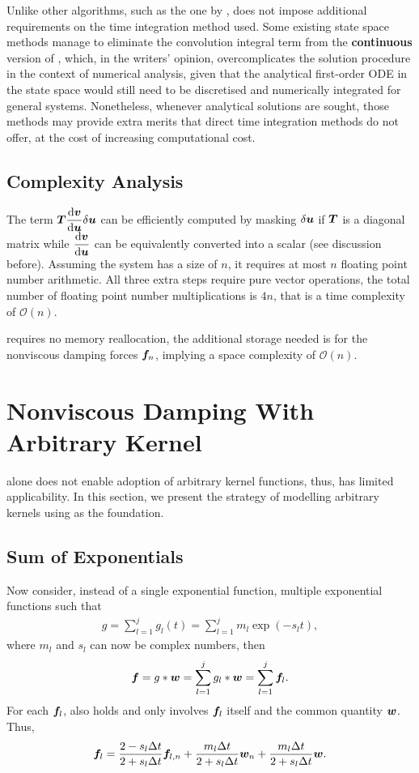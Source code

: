 Unlike other algorithms, such as the one by \citet{Cortes2009},  does not impose additional requirements on the time integration method used. Some existing state space methods manage to eliminate the convolution integral term from the \textbf{continuous} version of  \citep[see][]{Wagner2003,Wu2019}, which, in the writers' opinion, overcomplicates the solution procedure in the context of numerical analysis, given that the analytical first-order ODE in the state space would still need to be discretised \citep{Adhikari2004} and numerically integrated for general systems. Nonetheless, whenever analytical solutions are sought, those methods may provide extra merits that direct time integration methods do not offer, at the cost of increasing computational cost.
\subsection{Complexity Analysis}
The term $\bm{T}\dfrac{\mathrm{d}\bm{v}}{\mathrm{d}\bm{u}}\delta\bm{u}$ can be efficiently computed by masking $\delta\bm{u}$ if $\bm{T}$ is a diagonal matrix while $\dfrac{\mathrm{d}\bm{v}}{\mathrm{d}\bm{u}}$ can be equivalently converted into a scalar (see discussion before). Assuming the system has a size of $n$, it requires at most $n$ floating point number arithmetic. All three extra steps require pure vector operations, the total number of floating point number multiplications is $4n$, that is a time complexity of $\mathcal{O}\left(n\right)$.

 requires no memory reallocation, the additional storage needed is for the nonviscous damping forces $\bm{f}_n$, implying a space complexity of $\mathcal{O}\left(n\right)$.
\section{Nonviscous Damping With Arbitrary Kernel}
 alone does not enable adoption of arbitrary kernel functions, thus, has limited applicability. In this section, we present the strategy of modelling arbitrary kernels using  as the foundation.
\subsection{Sum of Exponentials}
Now consider, instead of a single exponential function, multiple exponential functions such that
\begin{gather}\label{eq:sum_exp}
g=\sum_{l=1}^{j}g_l\left(t\right)=\sum_{l=1}^{j}m_l\exp\left(-s_lt\right),
\end{gather}
where $m_l$ and $s_l$ can now be complex numbers, then
\begin{gather}\label{eq:sum_conv}
\bm{f}=g*\bm{w}=\sum_{l=1}^{j}g_l*\bm{w}=\sum_{l=1}^{j}\bm{f}_l.
\end{gather}
For each $\bm{f}_l$,  also holds and only involves $\bm{f}_l$ itself and the common quantity $\bm{w}$. Thus,
\begin{gather}
\bm{f}_l=\dfrac{2-s_l\Delta{}t}{2+s_l\Delta{}t}\bm{f}_{l,n}+\dfrac{m_l\Delta{}t}{2+s_l\Delta{}t}\bm{w}_n+\dfrac{m_l\Delta{}t}{2+s_l\Delta{}t}\bm{w}.
\end{gather}

